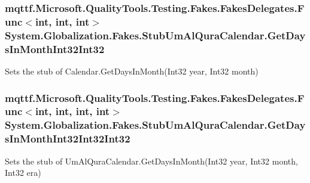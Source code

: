 \hypertarget{class_system_1_1_globalization_1_1_fakes_1_1_stub_um_al_qura_calendar_aa173f61f7caf646bc0509d8f8f336439}{
\subsubsection[{Get\-Days\-In\-Month\-Int32\-Int32}]{\setlength{\rightskip}{0pt plus 5cm}mqttf.\-Microsoft.\-Quality\-Tools.\-Testing.\-Fakes.\-Fakes\-Delegates.\-Func$<$int, int, int$>$ System.\-Globalization.\-Fakes.\-Stub\-Um\-Al\-Qura\-Calendar.\-Get\-Days\-In\-Month\-Int32\-Int32}}\label{class_system_1_1_globalization_1_1_fakes_1_1_stub_um_al_qura_calendar_aa173f61f7caf646bc0509d8f8f336439}


Sets the stub of Calendar.\-Get\-Days\-In\-Month(\-Int32 year, Int32 month)

\hypertarget{class_system_1_1_globalization_1_1_fakes_1_1_stub_um_al_qura_calendar_a92ffa4443157a5f09c2fb5f3830318d6}{
\subsubsection[{Get\-Days\-In\-Month\-Int32\-Int32\-Int32}]{\setlength{\rightskip}{0pt plus 5cm}mqttf.\-Microsoft.\-Quality\-Tools.\-Testing.\-Fakes.\-Fakes\-Delegates.\-Func$<$int, int, int, int$>$ System.\-Globalization.\-Fakes.\-Stub\-Um\-Al\-Qura\-Calendar.\-Get\-Days\-In\-Month\-Int32\-Int32\-Int32}}\label{class_system_1_1_globalization_1_1_fakes_1_1_stub_um_al_qura_calendar_a92ffa4443157a5f09c2fb5f3830318d6}


Sets the stub of Um\-Al\-Qura\-Calendar.\-Get\-Days\-In\-Month(\-Int32 year, Int32 month, Int32 era)


